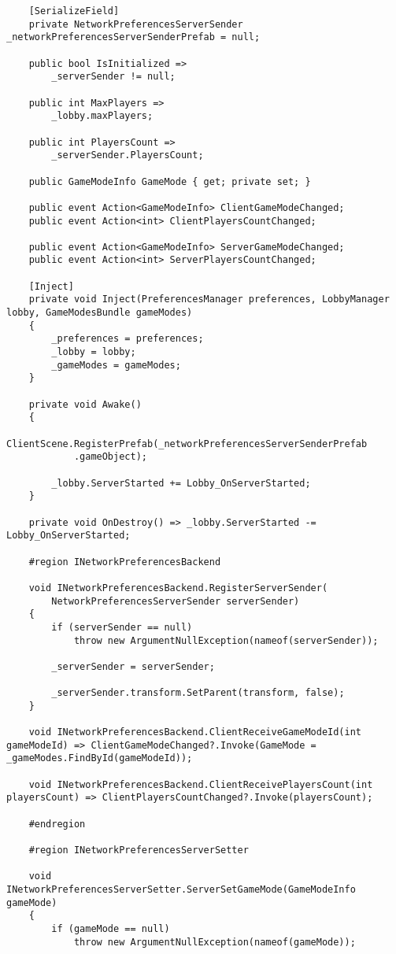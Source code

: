 \begin{lstlisting}
    [SerializeField]
    private NetworkPreferencesServerSender _networkPreferencesServerSenderPrefab = null;

    public bool IsInitialized =>
        _serverSender != null;

    public int MaxPlayers =>
        _lobby.maxPlayers;

    public int PlayersCount =>
        _serverSender.PlayersCount;

    public GameModeInfo GameMode { get; private set; }

    public event Action<GameModeInfo> ClientGameModeChanged;
    public event Action<int> ClientPlayersCountChanged;

    public event Action<GameModeInfo> ServerGameModeChanged;
    public event Action<int> ServerPlayersCountChanged;

    [Inject]
    private void Inject(PreferencesManager preferences, LobbyManager lobby, GameModesBundle gameModes)
    {
        _preferences = preferences;
        _lobby = lobby;
        _gameModes = gameModes;
    }

    private void Awake()
    {
        ClientScene.RegisterPrefab(_networkPreferencesServerSenderPrefab
            .gameObject);

        _lobby.ServerStarted += Lobby_OnServerStarted;
    }

    private void OnDestroy() => _lobby.ServerStarted -= Lobby_OnServerStarted;

    #region INetworkPreferencesBackend

    void INetworkPreferencesBackend.RegisterServerSender(
        NetworkPreferencesServerSender serverSender)
    {
        if (serverSender == null)
            throw new ArgumentNullException(nameof(serverSender));

        _serverSender = serverSender;

        _serverSender.transform.SetParent(transform, false);
    }

    void INetworkPreferencesBackend.ClientReceiveGameModeId(int gameModeId) => ClientGameModeChanged?.Invoke(GameMode = _gameModes.FindById(gameModeId));

    void INetworkPreferencesBackend.ClientReceivePlayersCount(int playersCount) => ClientPlayersCountChanged?.Invoke(playersCount);

    #endregion

    #region INetworkPreferencesServerSetter

    void INetworkPreferencesServerSetter.ServerSetGameMode(GameModeInfo gameMode)
    {
        if (gameMode == null)
            throw new ArgumentNullException(nameof(gameMode));


\end{lstlisting}
